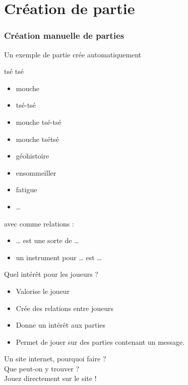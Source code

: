 \documentclass{beamer}
\begin{document}
\section{Création de partie}
\begin{frame}
  \frametitle{Création manuelle de parties}
  Un exemple de partie crée automatiquement
    \begin{center}
		tsé tsé
    \end{center}
	  \begin{multicols}{2}
		\begin{itemize}
		  \item mouche
		  \item tsé-tsé
		  \item mouche tsé-tsé
		  \item mouche tsétsé
		  \item géohistoire
		  \item ensommeiller
		  \item fatigue
		  \item \dots{}
	    \end{itemize}
	  \end{multicols}
	  avec comme relations :
	  \begin{itemize}
	  	\item \dots{} est une sorte de \dots{}
		\item un instrument pour \dots{} est \dots{}
	  \end{itemize}
\end{frame}

\begin{frame}
  \large Quel intérêt pour les joueurs ?

  \begin{itemize}
    \item Valorise le joueur
    \item Crée des relations entre joueurs
    \item Donne un intérêt aux parties
    \item Permet de jouer sur des parties contenant un message.
  \end{itemize}
\end{frame}

\begin{frame}
    \large Un site internet, pourquoi faire ?
\newline \\
    \large Que peut-on y trouver ?
\newline \\
    \large Jouez directement sur le site !
\end{frame}
\end{document}
